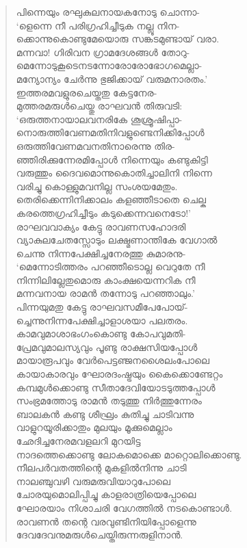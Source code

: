 \begin{verse}
പിന്നെയും രഘുകുലനായകനോടു ചൊന്നാ-\\
‘ളെന്നെ നീ പരിഗ്രഹിച്ചീടുക നല്ലൂ നിന-\\
ക്കൊന്നുകൊണ്ടുമേയൊരു സങ്കടമുണ്ടായ് വരാ.\\
മന്നവാ! ഗിരിവന ഗ്രാമദേശങ്ങള്‍ തോറു-\\
മെന്നോടുകൂടെനടന്നോരോരോഭോഗമെല്ലാ-\\
മന്യോന്യം ചേര്‍ന്നു ഭുജിക്കായ് വരുമനാരതം.’\\
ഇത്തരമവളുരചെയ്തതു കേട്ടനേര-\\
മുത്തരമരുള്‍ചെയ്തു രാഘവന്‍ തിരുവടി:\\
‘ഒരുത്തനായാലവനരികേ ശൂശ്രൂഷിപ്പാ-\\
നൊരുത്തിവേണമതിനിവളുണ്ടെനിക്കിപ്പോള്‍\\
ഒരുത്തിവേണമവനതിനാരെന്നു തിര-\\
ഞ്ഞിരിക്കുന്നേരമിപ്പോള്‍ നിന്നെയും കണ്ടുകിട്ടി\\
വരുത്തും ദൈവമൊന്നുകൊതിച്ചാലിനി നിന്നെ\\
വരിച്ചു കൊള്ളുമവനില്ല സംശയമേതും.\\
തെരിക്കെന്നിനിക്കാലം കളഞ്ഞീടാതെ ചെല്ക\\
കരത്തെഗ്രഹിച്ചീടും കടുക്കെന്നവനെടോ!’\\
രാഘവവാക്യം കേട്ടു രാവണസഹോദരി\\
വ്യാകുലചേതസ്സോടും ലക്ഷ്മണാന്തികേ വേഗാല്‍\\
ചെന്നു നിന്നപേക്ഷിച്ചനേരത്തു കുമാരനു-\\
‘മെന്നോടിത്തരം പറഞ്ഞീടൊല്ല വെറുതേ നീ\\
നിന്നിലില്ലേതുമൊരു കാംക്ഷയെന്നറിക നീ\\
മന്നവനായ രാമന്‍ തന്നോടു പറഞ്ഞാലും.’\\
പിന്നയുമതു കേട്ടു രാഘവസമീപേപോയ്-\\
ച്ചെന്നുനിന്നപേക്ഷിച്ചാളാശയാ പലതരം.\\
കാമവുമാശാഭംഗംകൊണ്ടു കോപവുമതി-\\
പ്രേമവുമാലസ്യവും പൂണ്ടു രാക്ഷസിയപ്പോള്‍\\
മായാരൂപവും വേര്‍പെട്ടഞ്ജനശൈലംപോലെ\\
കായാകാരവും ഘോരദംഷ്ട്രയും കൈക്കൊണ്ടേറ്റം\\
കമ്പമുള്‍ക്കൊണ്ടു സീതാദേവിയോടടുത്തപ്പോള്‍\\
സംഭ്രമത്തോടു രാമന്‍ തടുത്തു നിര്‍ത്തുന്നേരം\\
ബാലകന്‍ കണ്ടു ശീഘ്രം കുതിച്ചു ചാടിവന്നു\\
വാളുറയൂരിക്കാതും മുലയും മൂക്കുമെല്ലാം\\
ഛേദിച്ചനേരമവളലറി മുറയിട്ട\\
നാദത്തെക്കൊണ്ടു ലോകമൊക്കെ മാറ്റൊലിക്കൊണ്ടു.\\
നീലപര്‍വതത്തിന്റെ മുകളില്‍നിന്നു ചാടി\\
നാലഞ്ചുവഴി വരുമരുവിയാറുപോലെ\\
ചോരയുമൊലിപ്പിച്ചു കാളരാത്രിയെപ്പോലെ\\
ഘോരയാം നിശാചരി വേഗത്തില്‍ നടകൊണ്ടാള്‍.\\
രാവണന്‍ തന്റെ വരവുണ്ടിനിയിപ്പോളെന്നു\\
ദേവദേവനുമരുള്‍ചെയ്തിരുന്നരുളിനാന്‍.
\end{verse}

